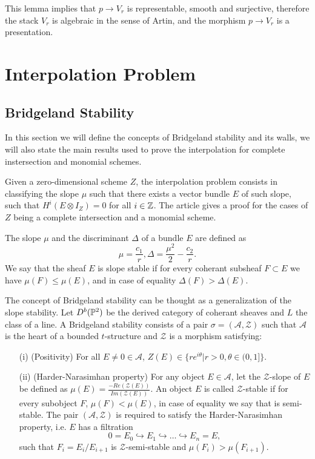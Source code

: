 \documentclass[
	oldfontcommands,
	sumario=abnt-6027-2012,
	12pt,			%
	openright,		%
	oneside,		%
	a4paper,		%
	english,		%
	brazil			%
	]{imecc-unicamp}
\begin{document}
This lemma implies that $p\rightarrow V_r$ is representable, smooth and surjective, therefore the stack $V_r$ is algebraic in the sense of Artin, and the morphism $p\rightarrow V_r$ is a presentation.

\chapter{Interpolation Problem}

\section{Bridgeland Stability}

In this section we will define the concepts of Bridgeland stability and its walls, we will also state the main results used to prove the interpolation for complete instersection and monomial schemes.

Given a zero-dimensional scheme $Z$, the interpolation problem consists in classifying the slope $\mu$ such that there exists a vector bundle $E$ of such slope, such that $H^i(E\otimes  I_Z)=0$ for all $i\in{\mathbb Z}$. The article \cite{COSKUN} gives a proof for the cases of $Z$ being a complete intersection and a monomial scheme.

The slope $\mu$ and the discriminant $\Delta$ of a bundle $E$ are defined as $$
\mu=\frac{c_1}{r}, \Delta=\frac{\mu^2}{2}-\frac{c_2}{r}.
$$
We say that the sheaf $E$ is slope stable if for every coherant subsheaf $F\subset E$ we have $\mu(F)\le\mu(E)$, and in case of equality $\Delta (F)>\Delta(E)$.

The concept of Bridgeland stability can be thought as a generalization of the slope stability. Let $D^b({\mathbb P}^2)$ be the derived category of coherant sheaves and $L$ the class of a line. A Bridgeland stability consists of a pair $\sigma=(\mathcal A,\mathcal Z)$ such that $\mathcal A$ is the heart of a bounded $t$-structure and $\mathcal Z$ is a morphism satisfying:
\begin{enumerate}
	\item[(i)](Positivity) For all $E\neq 0\in \mathcal A$, $Z(E)\in\{re^{i\theta}|r>0,\theta\in(0,1]\}$.
	\item[(ii)](Harder-Narasimhan property) For any object $E\in \mathcal A$, let the $\mathcal Z$-slope of $E$ be defined as $\mu(E)=\frac{-Re(\mathcal Z(E))}{Im(\mathcal Z(E))}$. An object $E$ is called $\mathcal Z$-stable if for every subobject $F$, $\mu(F)<\mu(E)$, in case of equality we say that is semi-stable. The pair $(\mathcal A,\mathcal Z)$ is required to satisfy the Harder-Narasimhan property, i.e. $E$ has a filtration $$
	0=E_0\hookrightarrow E_1\hookrightarrow\dots\hookrightarrow E_n=E,
	$$ 
	such that $F_i=E_i/E_{i+1}$ is $\mathcal Z$-semi-stable and $\mu(F_i)>\mu(F_{i+1})$.
\end{enumerate}
\end{document}
